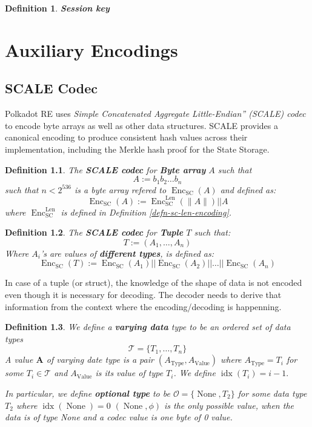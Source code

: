 \documentclass{book}
\newcommand{\assign}{:=}
\newcommand{\tmem}[1]{{\em #1\/}}
\newcommand{\tmmathbf}[1]{\ensuremath{\boldsymbol{#1}}}
\newcommand{\tmop}[1]{\ensuremath{\operatorname{#1}}}
\newcommand{\tmstrong}[1]{\textbf{#1}}
\newcommand{\tmtextbf}[1]{{\bfseries{#1}}}
\newcommand{\tmtextit}[1]{{\itshape{#1}}}
\newtheorem{definition}{Definition}
\providecommand{\tmem}[1]{\tmtextit{#1}}
\providecommand{\tmop}[1]{\ensuremath{\mathrm{#1}}}
\providecommand{\tmstrong}[1]{\tmtextbf{#1}}
\providecommand{\tmtextbf}[1]{\tmtextbf{#1}}
\providecommand{\tmtextit}[1]{\tmtextit{#1}}
\newtheorem{definition}{Definition}
\begin{document}
\begin{definition}
  {\tmstrong{Session key}} {}
\end{definition}

\chapter{Auxiliary Encodings}\label{sect-encoding}

\section{SCALE Codec}\label{sect-scale-codec}

Polkadot RE uses {\tmem{Simple Concatenated Aggregate Little-Endian'' (SCALE)
codec}} to encode byte arrays as well as other data structures. SCALE provides
a canonical encoding to produce consistent hash values across their
implementation, including the Merkle hash proof for the State Storage.

\begin{definition}
  \label{defn-scale-byte-array}The {\tmstrong{SCALE codec}} for
  {\tmstrong{Byte array}} $A$ such that
  \[ A \assign b_1 b_2 \ldots b_n \]
  such that $n < 2^{536}$ is a byte array refered to $\tmop{Enc}_{\tmop{SC}}
  (A)$ and defined as:
  \[ \tmop{Enc}_{\tmop{SC}} (A) \assign \tmop{Enc}^{\tmop{Len}}_{\tmop{SC}}
     (\| A \|) | | A \]
  where $\tmop{Enc}_{\tmop{SC}}^{\tmop{Len}}$ is defined in Definition
  \ref{defn-sc-len-encoding}. 
\end{definition}

\begin{definition}
  \label{defn-scale-tuple}The {\tmstrong{SCALE codec}} for {\tmstrong{Tuple}}
  $T$ such that:
  \[ T \assign (A_1, \ldots, A_n) \]
  Where $A_i$'s are values of {\tmstrong{different types}}, is defined as:
  \[ \tmop{Enc}_{\tmop{SC}} (T) \assign \tmop{Enc}_{\tmop{SC}} (A_1) | |
     \tmop{Enc}_{\tmop{SC}} (A_2) | | \ldots | | \tmop{Enc}_{\tmop{SC}} (A_n)
  \]
\end{definition}

In case of a tuple (or struct), the knowledge of the shape of data is not
encoded even though it is necessary for decoding. The decoder needs to derive
that information from the context where the encoding/decoding is happenning.

\begin{definition}
  \label{defn-varrying-data-type}We define a {\tmstrong{varying data}} type to
  be an ordered set of data types
  \[ \mathcal{T}= \{ T_1, \ldots, T_n \} \]
  A value $\tmmathbf{A}$ of varying date type is a pair $(A_{\tmop{Type}},
  A_{\tmop{Value}})$ where $A_{\tmop{Type}} = T_i$ for some $T_i \in
  \mathcal{T}$ and $A_{\tmop{Value}}$ is its value of type $T_i$. We define
  $\tmop{idx} (T_i) = i - 1.$
  
  In particular, we define {\tmstrong{optional type}} to be $\mathcal{O}= \{
  \tmop{None}, T_2 \}$ for some data type $T_2$ where $\tmop{idx}
  (\tmop{None}) = 0$ $(\tmop{None}, \phi)$ is the only possible value, when
  the data is of type None and a codec value is one byte of 0 value.
  
  
\end{definition}
\end{document}
